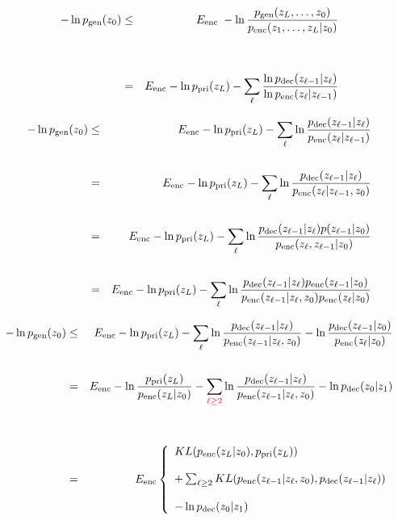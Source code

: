 {{\huge
\begin{eqnarray*}
- \ln p_{\mathrm{gen}}(z_0) & \leq & E_{\mathrm{enc}}\; -\ln \frac{p_{\mathrm{gen}}(z_L,\ldots,z_0)}{p_{\mathrm{enc}}(z_1,\ldots,z_L|z_0)}
\\
\\
\\
& = & E_{\mathrm{enc}} -\ln p_{\mathrm{pri}}(z_L) - \sum_{\ell } \frac{\ln p_{\mathrm{dec}}(z_{\ell-1}|z_\ell)}{\ln p_{\mathrm{enc}}(z_\ell|z_{\ell-1})}
\end{eqnarray*}
}


{\huge
\begin{eqnarray*}
- \ln p_{\mathrm{gen}}(z_0) & \leq & E_{\mathrm{enc}} -\ln p_{\mathrm{pri}}(z_L) - \sum_{\ell } \ln \frac{p_{\mathrm{dec}}(z_{\ell-1}|z_\ell)}{p_{\mathrm{enc}}(z_\ell|z_{\ell-1})} \\
\\
& = & E_{\mathrm{enc}} -\ln p_{\mathrm{pri}}(z_L) - \sum_{\ell } \ln \frac{p_{\mathrm{dec}}(z_{\ell-1}|z_\ell)}{p_{\mathrm{enc}}(z_\ell|z_{\ell-1},z_0)} \\
\\
& = & E_{\mathrm{enc}} -\ln p_{\mathrm{pri}}(z_L) - \sum_{\ell } \ln \frac{p_{\mathrm{dec}}(z_{\ell-1}|z_\ell)p(z_{\ell-1}|z_0)}{p_{\mathrm{enc}}(z_\ell,z_{\ell-1}|z_0)} \\
\\
& = & E_{\mathrm{enc}} -\ln p_{\mathrm{pri}}(z_L) - \sum_{\ell } \ln \frac{p_{\mathrm{dec}}(z_{\ell-1}|z_\ell)p_{\mathrm{enc}}(z_{\ell-1}|z_0)}{p_{\mathrm{enc}}(z_{\ell-1}|z_\ell,z_0)p_{\mathrm{enc}}(z_\ell|z_0)}
\end{eqnarray*}
}


{\huge
\begin{eqnarray*}
- \ln p_{\mathrm{gen}}(z_0) & \leq & E_{\mathrm{enc}} -\ln p_{\mathrm{pri}}(z_L) - \sum_{\ell } \ln \frac{p_{\mathrm{dec}}(z_{\ell-1}|z_\ell)}{p_{\mathrm{enc}}(z_{\ell-1}|z_\ell,z_0)}
- \ln \frac{p_{\mathrm{dec}}(z_{\ell-1}|z_0)}{p_{\mathrm{enc}}(z_\ell|z_0)} \\
\\
& = & E_{\mathrm{enc}} -\ln \frac{p_{\mathrm{pri}}(z_L)}{p_{\mathrm{enc}}(z_L|z_0)} - \sum_{\color{red} \ell \geq 2} \ln \frac{p_{\mathrm{dec}}(z_{\ell-1}|z_\ell)}{p_{\mathrm{enc}}(z_{\ell-1}|z_\ell,z_0)} - \ln p_{\mathrm{dec}}(z_0|z_1) \\
\\
\\
& = & E_{\mathrm{enc}} \left\{\begin{array}{l}KL(p_{\mathrm{enc}}(z_L|z_0),p_{\mathrm{pri}}(z_L)) \\
\\
+ \sum_{\ell \geq 2} KL(p_{\mathrm{enc}}(z_{\ell-1}|z_\ell,z_0),p_{\mathrm{dec}}(z_{\ell-1}|z_\ell)) \\
\\
- \ln p_{\mathrm{dec}}(z_0|z_1) \end{array} \right.
\end{eqnarray*}
}


}

